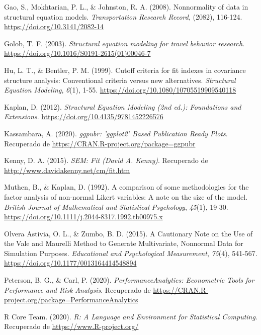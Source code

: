 \documentclass[
  english]{revcoles}
\begin{document}
\leavevmode\hypertarget{ref-Gao2008}{}%
Gao, S., Mokhtarian, P. L., \& Johnston, R. A. (2008). Nonnormality of
data in structural equation models. \emph{Transportation Research
Record}, (2082), 116-124. \url{https://doi.org/10.3141/2082-14}

\leavevmode\hypertarget{ref-Golob2003}{}%
Golob, T. F. (2003). \emph{Structural equation modeling for travel
behavior research}. \url{https://doi.org/10.1016/S0191-2615(01)00046-7}

\leavevmode\hypertarget{ref-Hu1999}{}%
Hu, L. T., \& Bentler, P. M. (1999). Cutoff criteria for fit indexes in
covariance structure analysis: Conventional criteria versus new
alternatives. \emph{Structural Equation Modeling}, \emph{6}(1), 1-55.
\url{https://doi.org/10.1080/10705519909540118}

\leavevmode\hypertarget{ref-Kaplan2012}{}%
Kaplan, D. (2012). \emph{Structural Equation Modeling (2nd ed.):
Foundations and Extensions}. \url{https://doi.org/10.4135/9781452226576}

\leavevmode\hypertarget{ref-ggpubr}{}%
Kassambara, A. (2020). \emph{ggpubr: 'ggplot2' Based Publication Ready
Plots}. Recuperado de \url{https://CRAN.R-project.org/package=ggpubr}

\leavevmode\hypertarget{ref-Kenny2015}{}%
Kenny, D. A. (2015). \emph{SEM: Fit (David A. Kenny)}. Recuperado de
\url{http://www.davidakenny.net/cm/fit.htm}

\leavevmode\hypertarget{ref-Muthen1992}{}%
Muthen, B., \& Kaplan, D. (1992). A comparison of some methodologies for
the factor analysis of non‐normal Likert variables: A note on the size
of the model. \emph{British Journal of Mathematical and Statistical
Psychology}, \emph{45}(1), 19-30.
\url{https://doi.org/10.1111/j.2044-8317.1992.tb00975.x}

\leavevmode\hypertarget{ref-OlveraAstivia2015}{}%
Olvera Astivia, O. L., \& Zumbo, B. D. (2015). A Cautionary Note on the
Use of the Vale and Maurelli Method to Generate Multivariate, Nonnormal
Data for Simulation Purposes. \emph{Educational and Psychological
Measurement}, \emph{75}(4), 541-567.
\url{https://doi.org/10.1177/0013164414548894}

\leavevmode\hypertarget{ref-PerformanceAnalytics}{}%
Peterson, B. G., \& Carl, P. (2020). \emph{PerformanceAnalytics:
Econometric Tools for Performance and Risk Analysis}. Recuperado de
\url{https://CRAN.R-project.org/package=PerformanceAnalytics}

\leavevmode\hypertarget{ref-R}{}%
R Core Team. (2020). \emph{R: A Language and Environment for Statistical
Computing}. Recuperado de \url{https://www.R-project.org/}
\end{document}

